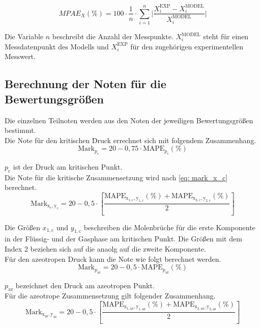 \documentclass[../thesis.tex]{subfiles}
\begin{document}
\begin{equation}
	MPAE_X(\%) = 100 \cdot \dfrac{1}{n} \cdot \sum_{i=1}^{n} \biggl| \dfrac{X_i^\mathrm{EXP} - X_i^\mathrm{MODEL}}{X_i^\mathrm{MODEL}} \biggr|
	\label{MPAE Glg}
\end{equation}

Die Variable $n$ beschreibt die Anzahl der Messpunkte. $X_i^\mathrm{MODEL}$ steht für einen Messdatenpunkt des Modells und $X_i^\mathrm{EXP}$ für den zugehörigen experimentellen Messwert.

\subsection{Berechnung der Noten für die Bewertungsgrößen}
Die einzelnen Teilnoten werden aus den Noten der jeweiligen Bewertungsgrößen bestimmt.
\\

Die Note für den kritischen Druck errechnet sich mit folgendem Zusammenhang.
\begin{equation}
	\mathrm{Mark}_{p_{\mathrm{c}}} = 20 - 0,75 \cdot \mathrm{MAPE}_{p_\mathrm{c}}(\%)
\end{equation}

$ p_\mathrm{c} $ ist der Druck am kritischen Punkt.
\\
Die Note für die kritische Zusammensetzung wird nach \autoref{eq: mark_x_c} berechnet.
\begin{equation}
\label{eq: mark_x_c}
\mathrm{Mark}_{\mathrm{x_\mathrm{c},y_\mathrm{c}}} = 20 - 0,5 \cdot \left[
	\dfrac{\mathrm{MAPE_{x_{1,\mathrm{c}},y_{1,\mathrm{c}}}}(\%) + \mathrm{MAPE_{x_{2,\mathrm{c}},y_{2,\mathrm{c}}}}(\%)}{2}
\right]
\end{equation}

Die Größen $ x_{1,\mathrm{c}} $ und $ y_{1,\mathrm{c}} $ beschreiben die Molenbrüche für die erste Komponente in der Flüssig- und der Gasphase am kritischen Punkt. Die Größen mit dem Index 2 beziehen sich auf die anaolg auf die zweite Komponente.
\\

Für den azeotropen Druck kann die Note wie folgt berechnet werden.
\begin{equation}
	\mathrm{Mark}_{p_{\mathrm{az}}} = 20 - 0,5 \cdot \mathrm{MAPE}_{p_\mathrm{az}}(\%)
\end{equation}

$ p_\mathrm{az} $ bezeichnet den Druck am azeotropen Punkt.
\\

Für die azeotrope Zusammensetzung gilt folgender Zusammenhang.
\begin{equation}
\mathrm{Mark}_{\mathrm{x_\mathrm{az},y_\mathrm{az}}} = 20 - 0,5 \cdot \left[
	\dfrac{\mathrm{MAPE_{x_{1,\mathrm{az}},y_{1,\mathrm{az}}}(\%)} + \mathrm{MAPE_{x_{2,\mathrm{az}},y_{2,\mathrm{az}}}}(\%)}{2}
\right]
\end{equation}
\end{document}
